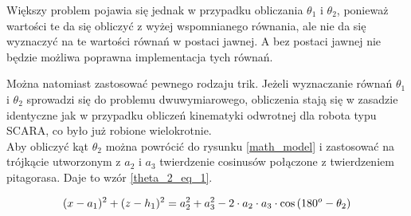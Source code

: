 \documentclass[a4paper,13pt]{article}
\begin{document}





Większy problem pojawia się jednak w przypadku obliczania $\theta_1$ i $\theta_2$, ponieważ wartości te da się obliczyć z wyżej wspomnianego równania, ale nie da się wyznaczyć na te wartości równań w postaci jawnej. A bez postaci jawnej nie będzie możliwa poprawna implementacja tych równań.

Można natomiast zastosować pewnego rodzaju trik. Jeżeli wyznaczanie równań $\theta_1$ i $\theta_2$ sprowadzi się do problemu dwuwymiarowego, obliczenia stają się w zasadzie identyczne jak w przypadku obliczeń kinematyki odwrotnej dla robota typu SCARA, co było już robione wielokrotnie.\\

Aby obliczyć kąt $\theta_2$ można powrócić do rysunku \ref{math_model} i zastosować na trójkącie utworzonym z $a_2$ i $a_3$ twierdzenie cosinusów połączone z twierdzeniem pitagorasa. Daje to wzór \ref{theta_2_eq_1}.

\begin{equation} \label{theta_2_eq_1}
(x - a_1)^2 + (z - h_1)^2 = a_2^2 + a_3^2 - 2 \cdot a_2 \cdot a_3 \cdot \cos{(180^o - \theta_2)}\\
\end{equation}
\end{document}

